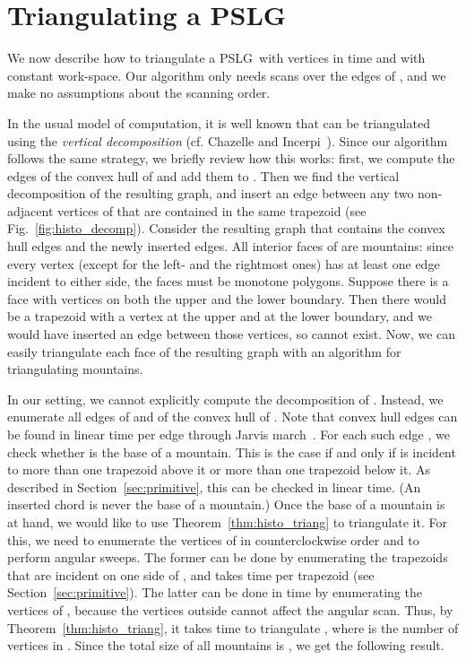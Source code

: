 \documentclass[11pt,a4paper]{article}
\newcommand{\histogram}{mountain}
\newcommand{\pslg}{PSLG}
\newcommand{\Pslg}{PSLG}
\begin{document}
\section{Triangulating a \Pslg}
\label{sec:polygon}

We now describe how to triangulate
a \pslg\  with  vertices in 
time and with constant work-space.
Our algorithm only needs  scans over the edges of
, and we make no assumptions about the scanning order.

In the usual model of computation, it is well known that  can
be triangulated using the \emph{vertical decomposition}
(cf. Chazelle and Incerpi~\cite{ChazelleIn84}).
Since our algorithm follows the same strategy, we briefly review
how this works: first, we compute
the edges of the convex hull of  and add them to . Then
we find the vertical decomposition of the resulting graph,
and insert an edge between any two non-adjacent vertices of
 that are contained in the same trapezoid
(see Fig.~\ref{fig:histo_decomp}).
Consider the resulting graph  that contains the convex hull edges
and the newly inserted edges.
All  interior faces of  are \histogram s:
since every vertex (except for the left- and the rightmost ones)
has at least one edge incident to either side,
the faces must be monotone polygons.
Suppose there is a face  with vertices on both the upper and the lower
boundary. Then there would be
a trapezoid with a vertex at the upper and at the lower
boundary, and we would have inserted an edge between those vertices,
so  cannot exist. Now, we can easily triangulate each face of the
resulting graph with an algorithm for triangulating \histogram s.

In our setting, we cannot explicitly compute the decomposition of .
Instead, we enumerate all edges of  and of the convex hull of
. Note that convex hull edges can be found
in linear time per edge through Jarvis march~\cite{s-chc-04}.
For each such edge , we check whether  is the  base of a
\histogram{}.
This is the case if and only if
 is incident to more than one trapezoid above it or more than
one trapezoid below  it.
As described in Section~\ref{sec:primitive}, this can
be checked in linear time.
(An inserted chord is never the base of a \histogram.)
Once the base of a \histogram{}  is at hand, we would like to
use Theorem~\ref{thm:histo_triang} to triangulate it.
For this, we need  to enumerate the
vertices of  in counterclockwise order and to perform
angular sweeps. The former can be done by enumerating the trapezoids
that are incident on one side of , and takes  time
per trapezoid (see Section~\ref{sec:primitive}).
The latter can be done in  time by enumerating the vertices of , because
the vertices outside  cannot affect the angular scan.
Thus, by Theorem~\ref{thm:histo_triang}, it takes  time to triangulate
, where  is the number of vertices in .
Since the total size of
all \histogram s is , we get the following result.
\end{document}
